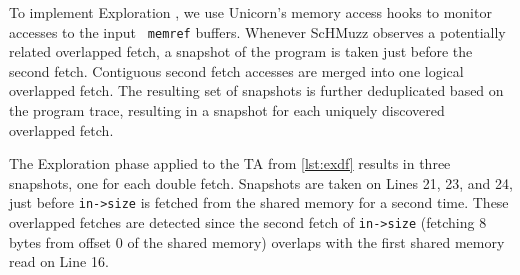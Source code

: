 \documentclass[conference]{IEEEtran} %
\newcommand{\sysname}{ScHMuzz\xspace}
\newcommand{\stageone}{Exploration\xspace}
\providecommand{\DIFaddtex}[1]{{\protect\color{blue} \sf #1}} %
\providecommand{\DIFaddbegin}{} %
\providecommand{\DIFaddend}{} %
\providecommand{\DIFadd}[1]{\texorpdfstring{\DIFaddtex{#1}}{#1}} %
\begin{document}
\DIFadd{To implement }\stageone\DIFadd{, we use Unicorn's memory access hooks to monitor accesses to the input }\texttt{\DIFadd{memref}} \DIFadd{buffers.
}\DIFaddend Whenever \sysname observes a potentially related overlapped fetch, 
a snapshot of the program is taken just before the second fetch. Contiguous second fetch accesses 
are merged into one logical overlapped fetch. 
The resulting set of snapshots is further deduplicated based on the program trace, resulting 
in a snapshot for each uniquely discovered overlapped fetch. 

\DIFaddbegin 



\DIFaddend %
The \stageone phase applied to the TA from \autoref{lst:exdf} results 
in three snapshots, one for each double fetch. Snapshots are taken on Lines 21, 23, and 24, 
just before \texttt{in->size} is fetched from the shared memory for a second time. These overlapped fetches 
are detected since the second fetch of \texttt{in->size} (fetching 8 bytes from offset 0 of 
the shared memory) overlaps with the first shared memory read on Line 16. 
\end{document}
